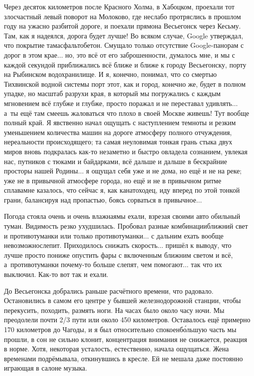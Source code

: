 Через десяток километров после Красного Холма, в Хабоцком, проехали тот злосчастный левый поворот на Молоково, где неслабо протряслись в прошлом году на ужасно разбитой дороге, и поехали прямо\mdash на Весьегонск через Кесьму. Там, как я надеялся, дорога будет лучше! Во всяком случае, Google утверждал, что покрытие там\mdash асфальтобетон. Смущало только отсутствие Google-панорам с дорог в этом крае$\ldots$ но, это всё от его заброшенности, думалось мне, и мы с каждой секундой приближались всё ближе и ближе к городу Весьегонску, порту на Рыбинском водохранилище. И я, конечно, понимал, что со смертью Тихвинской водной системы порт этот, как и город, конечно же, будет в полном упадке, но масштаб разрухи края, в который мы погружались с каждым мгновением всё глубже и глубже, просто поражал и не переставал удивлять$\ldots$ а~ты ещё там смеешь жаловаться что плохо в своей Москве живешь! Тут вообще полный край. Я явственно начал ощущать с наступлением темноты и резким уменьшением количества машин на дороге атмосферу полного отчуждения, нереальности происходящего; та самая неуловимая тонкая грань стыка двух миров вновь подкралась как-то незаметно и быстро овладела сознанием, увлекая нас, путников с тюками и байдарками, всё дальше и дальше в бескрайние просторы нашей Родины$\ldots$ я ощущал себя уже и не дома, но ещё и не на реке; уже не в привычной атмосфере города, но ещё и не в привычном ритме сплава\mdash мне казалось, что сейчас я, как канатоходец, иду вперед по этой тонкой грани, балансируя над пропастью, боясь сорваться в привычное$\ldots$

Погода стояла очень и очень влажная\mdash мы ехали, взрезая своими авто обильный туман. Видимость резко ухудшилась. Пробовал разные комбинации\mdash ближний свет и противотуманки или только противотуманки$\ldots$ с дальним ехать вообще невозможно\mdash слепит. Приходилось снижать скорость$\ldots$ пришёл к выводу, что лучше просто пониже опустить фары с включенным ближним светом и всё, а~противотуманки почему-то больше слепят, чем помогают$\ldots$ так что их выключил. Как-то вот так и ехали. 

До Весьегонска добрались раньше расчётного времени, что радовало. Остановились в самом его центре у бывшей железнодорожной станции, чтобы перекусить, походить, размять ноги. На часах было около часу ночи. Мы преодолели почти 2/3 пути или около 450 километров. Оставалось ещё примерно 170 километров до Чагоды, и я был относительно спокоен\mdash б\'{о}льшую часть мы прошли, в сон не сильно клонит, концентрация внимания не снижается, реакция в норме. Хотя, некоторая усталость, естественно, начала ощущаться. Жена временами подрёмывала, откинувшись в кресле. Ей не мешала даже постоянно играющая в салоне музыка. 

